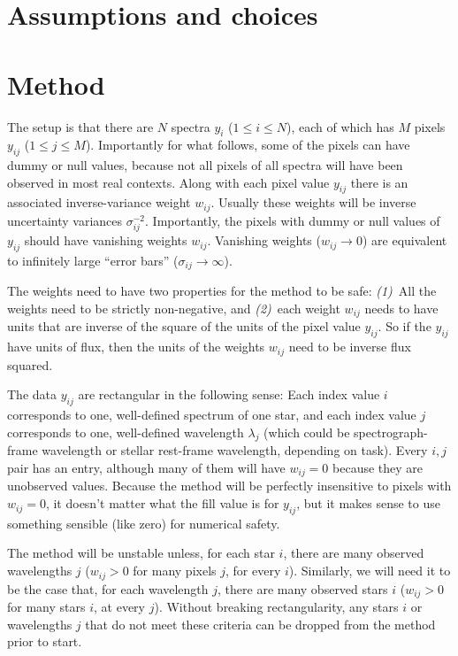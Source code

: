 \documentclass{article}
\begin{document}
\section{Assumptions and choices}

\section{Method}
The setup is that there are $N$ spectra $y_i$ ($1\leq i\leq N$),
each of which has $M$ pixels $y_{ij}$ ($1\leq j\leq M$).
Importantly for what follows, some of the pixels can have dummy or null values, because not all pixels of all spectra will have been observed in most real contexts.
Along with each pixel value $y_{ij}$ there is an associated inverse-variance weight $w_{ij}$.
Usually these weights will be inverse uncertainty variances $\sigma_{ij}^{-2}$.
Importantly, the pixels with dummy or null values of $y_{ij}$ should have vanishing weights $w_{ij}$.
Vanishing weights ($w_{ij}\rightarrow 0$) are equivalent to infinitely large ``error bars'' ($\sigma_{ij}\rightarrow\infty$).

The weights need to have two properties for the method to be safe:
\textsl{(1)}~All the weights need to be strictly non-negative, and
\textsl{(2)}~each weight $w_{ij}$ needs to have units that are inverse of the square of the units of the pixel value $y_{ij}$.
So if the $y_{ij}$ have units of flux, then the units of the weights $w_{ij}$ need to be inverse flux squared.

The data $y_{ij}$ are rectangular in the following sense:
Each index value $i$ corresponds to one, well-defined spectrum of one star, and
each index value $j$ corresponds to one, well-defined wavelength $\lambda_j$ (which could be spectrograph-frame wavelength or stellar rest-frame wavelength, depending on task).
Every $i,j$ pair has an entry, although many of them will have $w_{ij}=0$ because they are unobserved values.
Because the method will be perfectly insensitive to pixels with $w_{ij}=0$, it doesn't matter what the fill value is for $y_{ij}$, but it makes sense to use something sensible (like zero) for numerical safety.

The method will be unstable unless, for each star $i$, there are many observed wavelengths $j$ ($w_{ij} > 0$ for many pixels $j$, for every $i$).
Similarly, we will need it to be the case that, for each wavelength $j$, there are many observed stars $i$ ($w_{ij} > 0$ for many stars $i$, at every $j$).
Without breaking rectangularity, any stars $i$ or wavelengths $j$ that do not meet these criteria can be dropped from the method prior to start.
\end{document}
